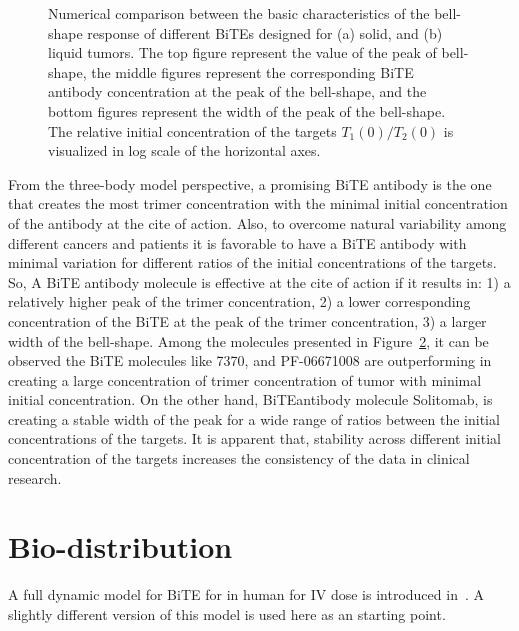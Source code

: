 \begin{figure}
\begin{subfigure}[b]{0.48\textwidth}
		\caption{}
		\label{fig:10}
	\end{subfigure}
	\caption[Comparison of the characteristics of the bell-shapes]{Numerical comparison between the basic characteristics of the bell-shape response of different \ac{BiTE}s designed for (a) solid, and (b) liquid tumors. The top figure represent the value of the peak of bell-shape, the middle figures represent the corresponding \ac{BiTE} antibody concentration at the peak of the bell-shape, and the bottom figures represent the width of the peak of the bell-shape. The relative initial concentration of the targets $T_1(0)/T_2(0)$ is visualized in log scale of the horizontal axes.} 
	\label{fig:res2}
\end{figure}

From the three-body model perspective, a promising \ac{BiTE} antibody is the one that creates the most trimer concentration with the minimal initial concentration of the antibody at the cite of action. Also, to overcome natural variability among different cancers and patients it is favorable to have a \ac{BiTE} antibody with minimal variation for different ratios of the initial concentrations of the targets. So, A \ac{BiTE} antibody molecule is effective at the cite of action if it results in: 1) a relatively higher peak of the trimer concentration, 2) a lower corresponding concentration of the \ac{BiTE} at the peak of the trimer concentration, 3) a larger width of the bell-shape. Among the molecules presented in Figure~\ref{fig:res2}, it can be observed the \ac{BiTE} molecules like 7370, and PF-06671008 are outperforming in creating a large concentration of trimer concentration of tumor with minimal initial concentration. On the other hand, \ac{BiTE}antibody molecule Solitomab, is creating a stable width of the peak for a wide range of ratios between the initial concentrations of the targets. It is apparent that, stability across different initial concentration of the targets increases the consistency of the data in clinical research.

\section{Bio-distribution}
A full dynamic model for \ac{BiTE} for in human for \ac{IV} dose is introduced in~\cite{betts2019translational}. A slightly different version of this model is used here as an starting point.

